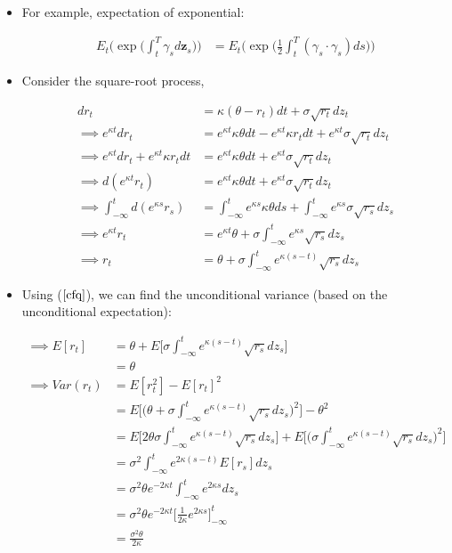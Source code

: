 \documentclass{article}
\newcommand{\zvec}{\mathbf{z}}
\begin{document}
\begin{itemize}
\item For example, expectation of exponential:

\begin{align}
E_t \Bigg( \exp \Bigg( \int_t^T \gamma_s d\zvec_s \Bigg) \Bigg) 
&= E_t \Bigg( \exp \Bigg( \frac{1}{2} \int_t^T (\gamma_s \cdot \gamma_s)ds \Bigg) \Bigg) \label{cfe}
\end{align}

\item Consider the square-root process,

\begin{align*}
dr_t &= \kappa(\theta - r_t)dt + \sigma \sqrt{r_t} dz_t\\
\implies e^{\kappa t} dr_t &= e^{\kappa t}\kappa \theta dt  - e^{\kappa t} \kappa r_t dt + e^{\kappa t}\sigma \sqrt{r_t} dz_t \\
\implies e^{\kappa t} dr_t + e^{\kappa t} \kappa r_t dt&= e^{\kappa t}\kappa \theta dt  + e^{\kappa t}\sigma \sqrt{r_t} dz_t \\
\implies d(e^{\kappa t} r_t) &= e^{\kappa t}\kappa \theta dt  + e^{\kappa t}\sigma \sqrt{r_t} dz_t \\
\implies \int_{-\infty}^{t} d(e^{\kappa s} r_s) &= \int_{-\infty}^{t} e^{\kappa s}\kappa \theta ds  + \int_{-\infty}^{t} e^{\kappa s}\sigma \sqrt{r_s} dz_s \\
\implies e^{\kappa t} r_t &= e^{\kappa t}\theta  + \sigma\int_{-\infty}^{t} e^{\kappa s} \sqrt{r_s} dz_s \\
\implies r_t &= \theta  + \sigma\int_{-\infty}^{t} e^{\kappa (s-t)} \sqrt{r_s} dz_s
\end{align*}

\pagebreak

\item Using ($\ref{cfq}$), we can find the unconditional variance (based on the unconditional expectation):

\begin{align*}
\implies E[r_t] 
&= \theta  + E\Bigg[\sigma\int_{-\infty}^{t} e^{\kappa (s-t)} \sqrt{r_s}dz_s \Bigg] \\
&= \theta \\
\implies Var(r_t) 
&= E[r_t^2] - E[r_t]^2 \\
&= E\Bigg[\Bigg(\theta  + \sigma\int_{-\infty}^{t} e^{\kappa (s-t)} \sqrt{r_s}dz_s \Bigg)^2 \Bigg] - \theta^2 \\
&= E\Bigg[2\theta  \sigma\int_{-\infty}^{t} e^{\kappa (s-t)} \sqrt{r_s}dz_s \Bigg] 
+ E\Bigg[\Bigg( \sigma\int_{-\infty}^{t} e^{\kappa (s-t)} \sqrt{r_s}dz_s \Bigg)^2 \Bigg] \\
&= \sigma^2 \int_{-\infty}^{t} e^{2 \kappa (s-t)}  E[  r_s ] dz_s\\
&= \sigma^2 \theta e^{-2\kappa t} \int_{-\infty}^{t} e^{2 \kappa s} dz_s\\
&= \sigma^2 \theta e^{-2\kappa t} \Bigg[ \frac{1}{2\kappa}e^{2 \kappa s} \Bigg]_{-\infty}^{t}\\
&= \frac{\sigma^2 \theta}{2\kappa}
\end{align*}


\end{itemize}
\end{document}
